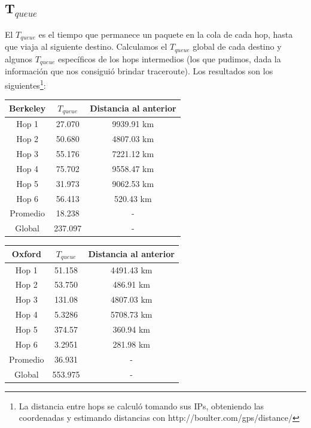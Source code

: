 \subsection{T$_{queue}$}

El $T_{queue}$ es el tiempo que permanece un paquete en la cola de cada hop, hasta que viaja al siguiente destino. Calculamos el $T_{queue}$ global de cada destino y algunos $T_{queue}$ específicos de los hops intermedios (los que pudimos, dada la información que nos consiguió brindar traceroute). Los resultados son los siguientes\footnote{La distancia entre hops se calculó tomando sus IPs, obteniendo las coordenadas y estimando distancias con http://boulter.com/gps/distance/}:\\

\begin{center}
\begin{tabular}{| c | c | c |}	\hline
	Berkeley 	& $T_{queue}$	& Distancia al anterior 	\\ \hline
	Hop 1	& 27.070		& 9939.91 km			\\ \hline
	Hop 2	& 50.680		& 4807.03 km		\\ \hline
	Hop 3	& 55.176		& 7221.12 km 	\\ \hline
	Hop 4	& 75.702		& 9558.47 km 	\\ \hline
	Hop 5	& 31.973		& 9062.53 km	 \\ \hline
	Hop 6	& 56.413		& 520.43 km	\\ \hline
	Promedio & 18.238	& -	\\ \hline
	Global	& 237.097	& -	\\ \hline
\end{tabular}
\vspace{1cm}
\begin{tabular}{| c | c | c |}	\hline
	Oxford 	& $T_{queue}$	& Distancia al anterior 	\\ \hline
	Hop 1	& 51.158		& 4491.43 km			\\ \hline
	Hop 2	& 53.750		& 486.91 km		\\ \hline
	Hop 3	& 131.08		& 4807.03 km 	\\ \hline
	Hop 4	& 5.3286		& 5708.73 km 	\\ \hline
	Hop 5	& 374.57 	& 360.94 km	 \\ \hline
	Hop 6	& 3.2951 	& 281.98 km	\\ \hline
	Promedio & 36.931	& -	\\ \hline
	Global	& 553.975	& -	\\ \hline
\end{tabular}

\end{center}
